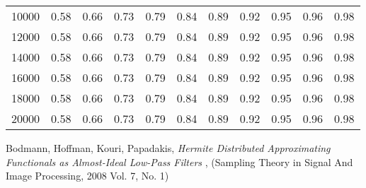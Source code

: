 \documentclass[amsmath,amssymb,floatfix]{revtex4}
\numberwithin{equation}{section}
\begin{document}
\begin{table}[htb]
\begin{ruledtabular}
\begin{tabular}{ccccccccccc}
10000 & 0.58 & 0.66 & 0.73 & 0.79 & 0.84 & 0.89 & 0.92 & 0.95 & 0.96 & 0.98 \\
12000 & 0.58 & 0.66 & 0.73 & 0.79 & 0.84 & 0.89 & 0.92 & 0.95 & 0.96 & 0.98 \\
14000 & 0.58 & 0.66 & 0.73 & 0.79 & 0.84 & 0.89 & 0.92 & 0.95 & 0.96 & 0.98 \\
16000 & 0.58 & 0.66 & 0.73 & 0.79 & 0.84 & 0.89 & 0.92 & 0.95 & 0.96 & 0.98 \\
18000 & 0.58 & 0.66 & 0.73 & 0.79 & 0.84 & 0.89 & 0.92 & 0.95 & 0.96 & 0.98 \\
20000 & 0.58 & 0.66 & 0.73 & 0.79 & 0.84 & 0.89 & 0.92 & 0.95 & 0.96 & 0.98 \\
\end{tabular}
\end{ruledtabular}
\end{table}






\begin{thebibliography}{14}

  Bodmann, Hoffman, Kouri, Papadakis,  \textit{Hermite Distributed Approximating Functionals as Almost-Ideal Low-Pass Filters} , (Sampling Theory in Signal And Image Processing, 2008 Vol. 7, No. 1)

\end{thebibliography}
\end{document}
